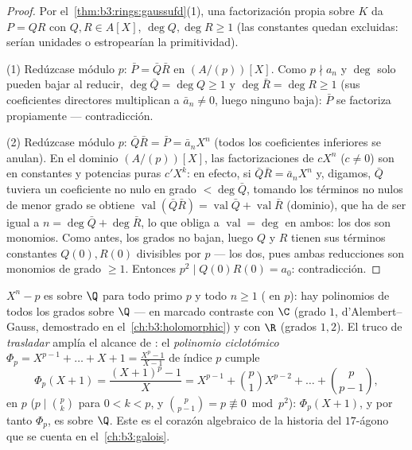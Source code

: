 \begin{proof}
Por el~\cref{thm:b3:rings:gaussufd}(1), una factorización propia sobre
$K$ da $P = QR$ con $Q, R \in A[X]$, $\deg Q, \deg R \geq 1$ (las
constantes quedan excluidas: serían unidades o estropearían la
primitividad).

(1) Redúzcase módulo $p$: $\bar P = \bar Q\bar R$ en $(A/(p))[X]$. Como
$p \nmid a_n$ y $\deg$ solo pueden bajar al reducir, $\deg \bar
Q = \deg Q \geq 1$ y $\deg\bar R = \deg R \geq 1$ (sus coeficientes
directores multiplican a $\bar a_n \neq 0$, luego ninguno baja):
$\bar P$ se factoriza propiamente --- contradicción.

(2) Redúzcase módulo $p$: $\bar Q \bar R = \bar P = \bar a_n X^n$ (todos
los coeficientes inferiores se anulan). En el dominio $(A/(p))[X]$, las
factorizaciones de $cX^n$ ($c \ne 0$) son en constantes y potencias
puras $c'X^k$: en efecto, si $\bar Q\bar R = \bar a_nX^n$ y, digamos,
$\bar Q$ tuviera un coeficiente no nulo en grado $< \deg\bar Q$, tomando
los términos no nulos de menor grado se obtiene
$\operatorname{val}(\bar Q\bar R) =
\operatorname{val}\bar Q + \operatorname{val}\bar R$ (dominio), que ha
de ser igual a $n = \deg\bar Q + \deg\bar R$, lo que obliga a
$\operatorname{val} = \deg$ en ambos: los dos son monomios. Como antes,
los grados no bajan, luego $Q$ y $R$ tienen sus términos constantes
$Q(0), R(0)$ divisibles por $p$ --- los dos, pues ambas reducciones son
monomios de grado $\geq 1$. Entonces $p^2 \mid
Q(0)R(0) = a_0$: contradicción.
\end{proof}

\begin{example}\label{ex:b3:rings:eisenstein}
$X^n - p$ es  sobre $\Q$
para todo primo $p$ y todo $n
\geq 1$ ( en $p$): hay
polinomios  de todos los
grados sobre $\Q$ --- en marcado contraste con $\C$ (grado $1$,
d'Alembert--Gauss, demostrado en el~\cref{ch:b3:holomorphic}) y con $\R$
(grados $1, 2$). El truco de \emph{trasladar} amplía el alcance de
: el \emph{polinomio
ciclotómico} $\Phi_p = X^{p-1} +
\dots + X + 1 = \frac{X^p - 1}{X - 1}$ de índice $p$ cumple
\[
\Phi_p(X + 1) = \frac{(X+1)^p - 1}{X}
= X^{p-1} + \binom{p}{1}X^{p-2} + \dots + \binom{p}{p-1},
\]
 en $p$ ($p \mid \binom pk$
para $0 < k < p$, y $\binom{p}{p-1} = p \not\equiv 0 \bmod p^2$):
$\Phi_p(X+1)$, y por tanto $\Phi_p$, es
 sobre $\Q$. Este es el
corazón algebraico de la historia del $17$-ágono que se cuenta en
el~\cref{ch:b3:galois}.
\end{example}

